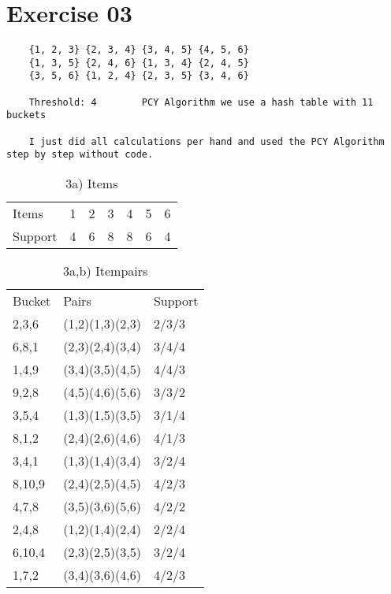 \documentclass[11pt,a4paper]{scrartcl}
\begin{document}
\section*{Exercise 03}
	\begin{verbatim}
	{1, 2, 3} {2, 3, 4} {3, 4, 5} {4, 5, 6}
	{1, 3, 5} {2, 4, 6} {1, 3, 4} {2, 4, 5}
	{3, 5, 6} {1, 2, 4} {2, 3, 5} {3, 4, 6}
	
	Threshold: 4		PCY Algorithm we use a hash table with 11 buckets
	
  	I just did all calculations per hand and used the PCY Algorithm step by step without code.
	\end{verbatim}
\begin{itemize}

\begin{table}[h]
\centering
\caption{3a) Items}
\label{my-label}
\begin{tabular}{lllllll}
Items & 1 & 2 & 3 & 4 & 5 & 6 \\
Support & 4 & 6 & 8 & 8 & 6 & 4
\end{tabular}
\end{table}

\begin{table}[h]
\centering
\caption{3a,b) Itempairs}
\label{my-label}
\begin{tabular}{lll}
Bucket & Pairs           & Support \\
2,3,6   & (1,2)(1,3)(2,3) & 2/3/3   \\
6,8,1   & (2,3)(2,4)(3,4) & 3/4/4   \\
1,4,9   & (3,4)(3,5)(4,5) & 4/4/3   \\
9,2,8   & (4,5)(4,6)(5,6) & 3/3/2   \\
3,5,4   & (1,3)(1,5)(3,5) & 3/1/4   \\
8,1,2   & (2,4)(2,6)(4,6) & 4/1/3   \\
3,4,1   & (1,3)(1,4)(3,4) & 3/2/4   \\
8,10,9   & (2,4)(2,5)(4,5) & 4/2/3   \\
4,7,8   & (3,5)(3,6)(5,6) & 4/2/2   \\
2,4,8   & (1,2)(1,4)(2,4) & 2/2/4   \\
6,10,4   & (2,3)(2,5)(3,5) & 3/2/4   \\
1,7,2   & (3,4)(3,6)(4,6) & 4/2/3  
\end{tabular}
\end{table}
	

\end{itemize}
\end{document}
